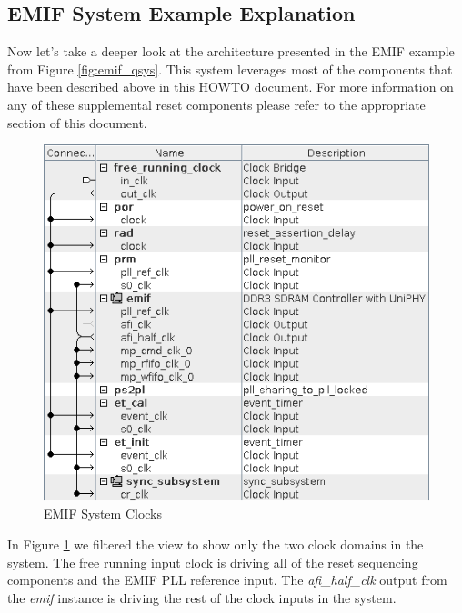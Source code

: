 \documentclass{article}
\begin{document}
\subsection*{EMIF System Example Explanation}
\begin{flushleft}
\noindent
Now let's take a deeper look at the architecture presented in the EMIF example from Figure \ref{fig:emif_qsys}.  This system leverages most of the components that have been described above in this HOWTO document.  For more information on any of these supplemental reset components please refer to the appropriate section of this document.

\begin{figure}[H]
\centering
\includegraphics[scale=0.675]{emif_clocks}
\caption{EMIF System Clocks}
\label{fig:emif_clocks}
\end{figure}

In Figure \ref{fig:emif_clocks} we filtered the view to show only the two clock domains in the system.  The free running input clock is driving all of the reset sequencing components and the EMIF PLL reference input.  The \emph{afi\_half\_clk} output from the \emph{emif} instance is driving the rest of the clock inputs in the system.


\end{flushleft}
\end{document}
